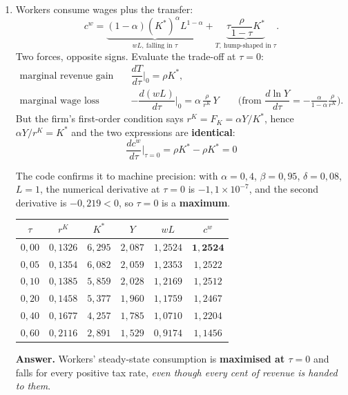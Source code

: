 \documentclass[12pt, letterpaper]{article}
\newcommand{\dd}[2]{\dfrac{d #1}{d #2}}
\newcommand{\stst}{^{\ast}}
\begin{document}
\begin{tcolorbox}[evenbox,title={Problem 9.6 \quad Capital Income Taxes}]
\begin{enumerate}
\item Workers consume wages plus the transfer:
\[
c^{w}=\underbrace{(1-\alpha)(K\stst)^{\alpha}L^{1-\alpha}}_{wL,\ \text{falling in }\tau}
+\underbrace{\tau\frac{\rho}{1-\tau}K\stst}_{T,\ \text{hump-shaped in }\tau} .
\]
Two forces, opposite signs. Evaluate the trade-off at $\tau=0$:
\begin{align*}
\text{marginal revenue gain}\quad
&\dd{T}{\tau}\bigg|_{0}=\rho K\stst,\\[4pt]
\text{marginal wage loss}\quad
&-\dd{(wL)}{\tau}\bigg|_{0}=\alpha\,\frac{\rho}{r^K}\,Y
\qquad\text{(from }\dd{\ln Y}{\tau}=-\tfrac{\alpha}{1-\alpha}\tfrac{\rho}{r^K}\text{).}
\end{align*}
But the firm's first-order condition says $r^K=F_K=\alpha Y/K\stst$, hence
$\alpha Y/r^K=K\stst$ and the two expressions are \textbf{identical}:
\[
\boxed{\ \dd{c^{w}}{\tau}\bigg|_{\tau=0}=\rho K\stst-\rho K\stst=0\ }
\]

\begin{tcolorbox}[databox]
The code confirms it to machine precision: with $\alpha=0{,}4$, $\beta=0{,}95$, $\delta=0{,}08$,
$L=1$, the numerical derivative at $\tau=0$ is $-1{,}1\times10^{-7}$, and the second derivative
is $-0{,}219<0$, so $\tau=0$ is a \textbf{maximum}.
\begin{center}
\small
\begin{tabular}{cccccc}
\toprule
$\tau$ & $r^K$ & $K\stst$ & $Y$ & $wL$ & $c^{w}$ \\
\midrule
$0{,}00$ & $0{,}1326$ & $6{,}295$ & $2{,}087$ & $1{,}2524$ & $\mathbf{1{,}2524}$ \\
$0{,}05$ & $0{,}1354$ & $6{,}082$ & $2{,}059$ & $1{,}2353$ & $1{,}2522$ \\
$0{,}10$ & $0{,}1385$ & $5{,}859$ & $2{,}028$ & $1{,}2169$ & $1{,}2512$ \\
$0{,}20$ & $0{,}1458$ & $5{,}377$ & $1{,}960$ & $1{,}1759$ & $1{,}2467$ \\
$0{,}40$ & $0{,}1677$ & $4{,}257$ & $1{,}785$ & $1{,}0710$ & $1{,}2204$ \\
$0{,}60$ & $0{,}2116$ & $2{,}891$ & $1{,}529$ & $0{,}9174$ & $1{,}1456$ \\
\bottomrule
\end{tabular}
\end{center}
\end{tcolorbox}

\textbf{Answer.} Workers' steady-state consumption is \textbf{maximised at $\tau=0$} and falls
for every positive tax rate, \emph{even though every cent of revenue is handed to them}.


\end{enumerate}
\end{tcolorbox}
\end{document}
